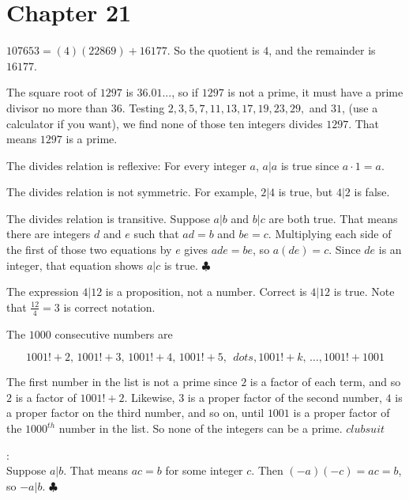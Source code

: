     \section*{Chapter 21}

\begin{Solution}{21.1}
$107653 = (4)(22869) + 16177$. So the quotient is $4$, and the remainder  is $16177$.
\end{Solution}

\begin{Solution}{21.2}

The square root of $1297$ is $36.01...$, so if $1297$ is not a prime, it must have a prime divisor no more than $36$. Testing $2, 3, 5, 7, 11, 13, 17, 19, 23, 29,$ and $31$, (use a calculator if you want), we find none of those ten integers divides $1297$. That means $1297$ is a prime.

\end{Solution}

\begin{Solution}{21.3}
The divides relation is reflexive: For every integer $a$, $a|a$ is true since $a\cdot 1 = a$.
\end{Solution}

\begin{Solution}{21.4}
The divides relation is not symmetric. For example, $2|4$ is true, but $4|2$ is false.
\end{Solution}

\begin{Solution}{21.5}
The divides relation is transitive. Suppose $a|b$ and $b|c$ are both true. That means there
are integers $d$ and $e$ such that $ad = b$ and $be = c$. Multiplying each side of the first 
of those two equations by $e$ gives $ade = be$, so $a(de)= c$. Since $de$ is an integer, that
equation shows $a|c$ is true. $\clubsuit$
\end{Solution}

\begin{Solution}{21.6}
The expression $4|12$ is a proposition, not a number. Correct is $4|12$ is true. 
Note that $\frac{12}{4}=3$ is correct notation.
\end{Solution}

\begin{Solution}{21.7}
The $1000$ consecutive numbers are

\[
1001! + 2,\,1001!+3,\, 1001!+4,\, 1001!+5,\,\;dots, 1001!+k,\,\ldots, 1001!+1001
\]

The first number in the list is not a prime since $2$ is a factor of each term, and so
$2$ is a factor of $1001!+2$. Likewise, $3$ is a proper factor of the second number, $4$ is
a proper factor on the third number, and so on, until $1001$ is a proper factor of the 
$1000^{th}$ number in the list. So none of the integers can be a prime. $clubsuit$
\end{Solution}

\begin{Solution}{21.8}
:\\
Suppose $a|b$. That means $ac = b$ for some integer $c$.
Then $(-a)(-c) = ac = b$, so $-a|b$. $\clubsuit$
\end{Solution}

